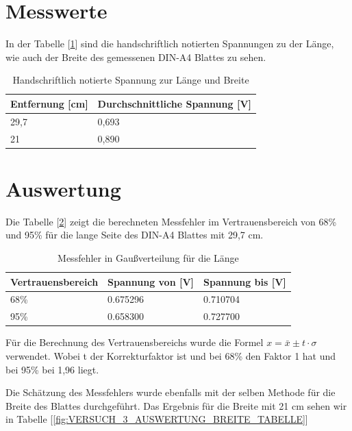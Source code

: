 \documentclass[12pt, oneside, a4paper, \docLanguage]{report}
\begin{document}
\section{Messwerte}
\label{chap:VERSUCH_3_MESSWERTE}
In der Tabelle [\ref{fig:VERSUCH_3_MESSWERTE_TABELLE}] sind die handschriftlich notierten Spannungen zu der Länge, wie auch der Breite des gemessenen DIN-A4 Blattes zu sehen.
\begin{table}[H]
\centering
\begin{tabular}{|l|l|}
\hline
\textbf{Entfernung {[}cm{]}} & \textbf{Durchschnittliche Spannung {[}V{]}} \\ \hline
29,7                         & 0,693                                       \\ \hline
21                           & 0,890                                       \\ \hline
\end{tabular}
\caption{Handschriftlich notierte Spannung zur Länge und Breite}
\label{fig:VERSUCH_3_MESSWERTE_TABELLE}
\end{table}

\section{Auswertung}
\label{chap:VERSUCH_3_AUSWERTUNG}
Die Tabelle [\ref{fig:VERSUCH_3_AUSWERTUNG_LAENGE_TABELLE}] zeigt die berechneten Messfehler im Vertrauensbereich von 68\% und 95\% für die lange Seite des DIN-A4 Blattes mit 29,7 cm. 
\begin{table}[H]
\centering
\begin{tabular}{|l|l|l|}
\hline
\textbf{Vertrauensbereich} & \textbf{Spannung von {[}V{]}} & \textbf{Spannung bis {[}V{]}} \\ \hline
68\%                       & 0.675296                      & 0.710704                      \\ \hline
95\%                       & 0.658300                      & 0.727700                      \\ \hline
\end{tabular}
\caption{Messfehler in Gaußverteilung für die Länge}
\label{fig:VERSUCH_3_AUSWERTUNG_LAENGE_TABELLE}
\end{table}

Für die Berechnung des Vertrauensbereichs wurde die Formel $x = \bar x \pm t \cdot \sigma$ verwendet. Wobei t der Korrekturfaktor ist und bei 68\% den Faktor 1 hat und bei 95\% bei 1,96 liegt.

Die Schätzung des Messfehlers wurde ebenfalls mit der selben Methode für die Breite des Blattes durchgeführt. Das Ergebnis für die Breite mit 21 cm sehen wir in Tabelle  [\ref{fig:VERSUCH_3_AUSWERTUNG_BREITE_TABELLE}]
\end{document}
